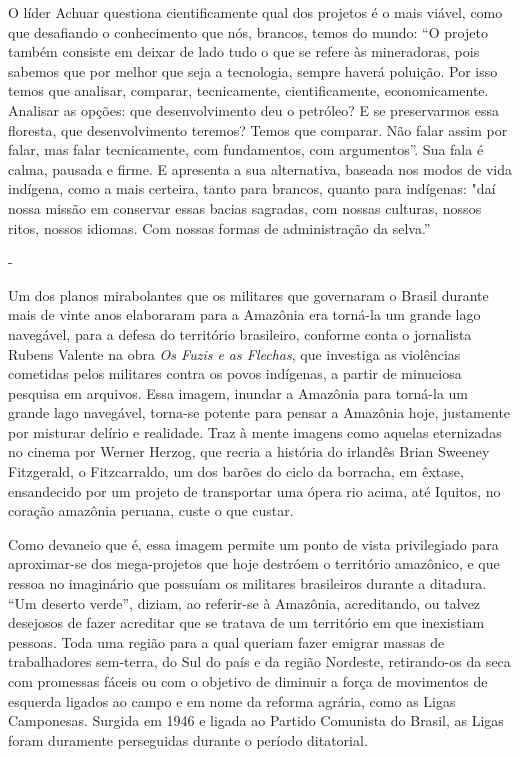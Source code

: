 O líder Achuar questiona cientificamente qual dos projetos é o mais
viável, como que desafiando o conhecimento que nós, brancos, temos do
mundo: ``O projeto também consiste em deixar de lado tudo o que se
refere às mineradoras, pois sabemos que por melhor que seja a
tecnologia, sempre haverá poluição. Por isso temos que analisar,
comparar, tecnicamente, cientificamente, economicamente. Analisar as
opções: que desenvolvimento deu o petróleo? E se preservarmos essa
floresta, que desenvolvimento teremos? Temos que comparar. Não falar
assim por falar, mas falar tecnicamente, com fundamentos, com
argumentos''. Sua fala é calma, pausada e firme. E apresenta a sua
alternativa, baseada nos modos de vida indígena, como a mais certeira,
tanto para brancos, quanto para indígenas: "daí nossa missão em
conservar essas bacias sagradas, com nossas culturas, nossos ritos,
nossos idiomas. Com nossas formas de administração da selva.''

-

Um dos planos mirabolantes que os militares que governaram o Brasil
durante mais de vinte anos elaboraram para a Amazônia era torná-la um
grande lago navegável, para a defesa do território brasileiro, conforme
conta o jornalista Rubens Valente na obra \emph{Os Fuzis e as Flechas},
que investiga as violências cometidas pelos militares contra os povos
indígenas, a partir de minuciosa pesquisa em arquivos. Essa imagem,
inundar a Amazônia para torná-la um grande lago navegável, torna-se
potente para pensar a Amazônia hoje, justamente por misturar delírio e
realidade. Traz à mente imagens como aquelas eternizadas no cinema por
Werner Herzog, que recria a história do irlandês Brian Sweeney
Fitzgerald, o Fitzcarraldo, um dos barões do ciclo da borracha, em
êxtase, ensandecido por um projeto de transportar uma ópera rio acima,
até Iquitos, no coração amazônia peruana, custe o que custar.

Como devaneio que é, essa imagem permite um ponto de vista privilegiado
para aproximar-se dos mega-projetos que hoje destróem o território
amazônico, e que ressoa no imaginário que possuíam os militares
brasileiros durante a ditadura. ``Um deserto verde'', diziam, ao
referir-se à Amazônia, acreditando, ou talvez desejosos de fazer
acreditar que se tratava de um território em que inexistiam pessoas.
Toda uma região para a qual queriam fazer emigrar massas de
trabalhadores sem-terra, do Sul do país e da região Nordeste,
retirando-os da seca com promessas fáceis ou com o objetivo de diminuir
a força de movimentos de esquerda ligados ao campo e em nome da reforma
agrária, como as Ligas Camponesas. Surgida em 1946 e ligada ao Partido
Comunista do Brasil, as Ligas foram duramente perseguidas durante o
período ditatorial.


